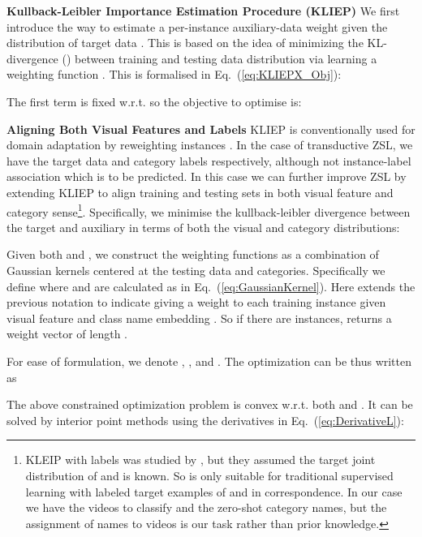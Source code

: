 \documentclass[runningheads]{llncs}
\begin{document}
\noindent\textbf{Kullback-Leibler Importance Estimation Procedure (KLIEP)}\quad
We first introduce the way to estimate a per-instance auxiliary-data weight given the distribution of target data . This is based on the idea \cite{Sugiyama2007} of minimizing the KL-divergence () between training  and testing data distribution  via learning a weighting function . This is formalised in Eq.~(\ref{eq:KLIEPX_Obj}):




\noindent The first term is fixed w.r.t.  so the objective to optimise is:







\noindent\textbf{Aligning Both Visual Features and Labels}\quad
KLIEP is conventionally used for domain adaptation by reweighting instances \cite{Sugiyama2007,Pardoe2010}. In the case of transductive ZSL, we have the target data  and category labels  respectively, although not instance-label association which is to be predicted. In this case we can further improve ZSL by extending KLIEP to align training and testing sets in both visual feature and category sense\footnote{KLEIP with labels was studied by \cite{Garcke2014}, but they assumed the target joint distribution of  and  is known. So \cite{Garcke2014} is only suitable for traditional supervised learning with labeled target examples of  and  in correspondence. In our case we have the videos to classify and the zero-shot category names, but the assignment of names to videos is our task rather than prior knowledge.}. Specifically, we minimise the kullback-leibler divergence between the target and auxiliary in terms of both the visual and category distributions: 



Given both  and , we construct the weighting functions as a combination of  Gaussian kernels centered at the testing data and categories. Specifically we define  where  and  are calculated as in Eq.~(\ref{eq:GaussianKernel}).  Here  extends the previous notation  to indicate giving a weight to each training instance given visual feature  and class name embedding . So if there are  instances,  returns a weight vector of length .





\noindent For  ease of formulation, we denote , ,  and . The optimization can be thus written as



\noindent The above constrained optimization problem is convex
w.r.t. both  and . It
 can be solved by interior point methods using the
derivatives in Eq.~(\ref{eq:DerivativeL}):
\end{document}
